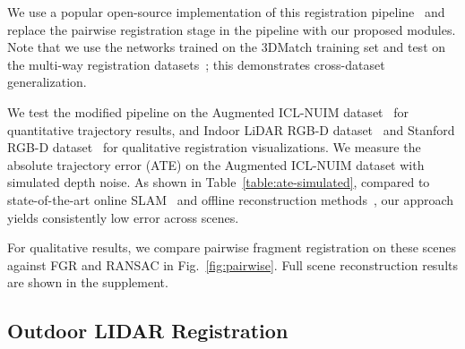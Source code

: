 \documentclass[10pt,twocolumn,letterpaper]{article}
\begin{document}
We use a popular open-source implementation of this registration pipeline~\cite{Zhou2018} and replace the pairwise registration stage in the pipeline with our proposed modules.
Note that we use the networks trained on the 3DMatch training set and test on the multi-way registration datasets~\cite{ahanda2014icra,Park2017,choi2015cvpr}; this demonstrates cross-dataset generalization.




We test the modified pipeline on the Augmented ICL-NUIM dataset~\cite{choi2015cvpr,ahanda2014icra} for quantitative trajectory results, and Indoor LiDAR RGB-D dataset~\cite{Park2017} and Stanford RGB-D dataset~\cite{choi2015cvpr} for qualitative registration visualizations.
We measure the absolute trajectory error (ATE) on the Augmented ICL-NUIM dataset with simulated depth noise. As shown in Table~\ref{table:ate-simulated}, compared to state-of-the-art online SLAM~\cite{Whelan2015,Kahler2016,Schops2019} and offline reconstruction methods~\cite{zhou2016eccv}, our approach yields consistently low error across scenes.

For qualitative results, we compare pairwise fragment registration on these scenes against FGR and RANSAC in Fig.~\ref{fig:pairwise}. Full scene reconstruction results are shown in the supplement.




\subsection{Outdoor LIDAR Registration}
\end{document}
